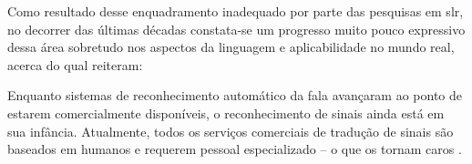 


Como resultado desse enquadramento inadequado por parte das pesquisas em \acrshort{slr}, no decorrer das últimas décadas constata-se um progresso muito pouco expressivo dessa área sobretudo nos aspectos da linguagem e aplicabilidade no mundo real, acerca do qual  reiteram:


\begin{citacao}
    Enquanto sistemas de reconhecimento automático da fala avançaram ao ponto de estarem comercialmente disponíveis, o reconhecimento de sinais ainda está em sua infância. Atualmente, todos os serviços comerciais de tradução de sinais são baseados em humanos e requerem pessoal especializado – o que os tornam caros \cite[tradução nossa]{cooper-2011-slr}.
\end{citacao}





